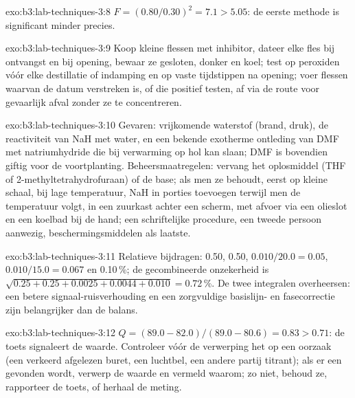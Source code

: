 \begin{solution}{exo:b3:lab-techniques-3:8}
$F = (0.80/0.30)^2 = 7.1 > 5.05$: de eerste methode is significant minder precies.
\end{solution}

\begin{solution}{exo:b3:lab-techniques-3:9}
Koop kleine flessen met inhibitor, dateer elke fles bij ontvangst en bij
opening, bewaar ze gesloten, donker en koel; test op peroxiden vóór elke
destillatie of indamping en op vaste tijdstippen na opening; voer
flessen waarvan de datum verstreken is, of die positief testen, af via
de route voor gevaarlijk afval zonder ze te concentreren.
\end{solution}

\begin{solution}{exo:b3:lab-techniques-3:10}
Gevaren: vrijkomende waterstof (brand, druk), de reactiviteit van NaH met
water, en een bekende exotherme ontleding van DMF met natriumhydride die
bij verwarming op hol kan slaan; DMF is bovendien giftig voor de
voortplanting. Beheersmaatregelen: vervang het oplosmiddel (THF of
2-methyltetrahydrofuraan) of de base; als men ze behoudt, eerst op
kleine schaal, bij lage temperatuur, NaH in porties toevoegen terwijl
men de temperatuur volgt, in een zuurkast achter een scherm, met afvoer
via een olieslot en een koelbad bij de hand; een schriftelijke
procedure, een tweede persoon aanwezig, beschermingsmiddelen als
laatste.
\end{solution}

\begin{solution}{exo:b3:lab-techniques-3:11}
Relatieve bijdragen: 0.50, 0.50, $0.010/20.0 = 0.05$, $0.010/15.0 = 0.067$ en 0.10\,\%; de
gecombineerde onzekerheid is $\sqrt{0.25 + 0.25 + 0.0025 + 0.0044 + 0.010} = 0.72$\,\%. De twee integralen overheersen: een betere
signaal-ruisverhouding en een zorgvuldige basislijn- en fasecorrectie
zijn belangrijker dan de balans.
\end{solution}

\begin{solution}{exo:b3:lab-techniques-3:12}
$Q = (89.0 - 82.0)/(89.0 - 80.6) = 0.83 > 0.71$: de toets signaleert de waarde. Controleer vóór de verwerping het 
op een oorzaak (een verkeerd afgelezen buret, een luchtbel, een andere
partij titrant); als er een gevonden wordt, verwerp de waarde en vermeld
waarom; zo niet, behoud ze, rapporteer de toets, of herhaal de meting.
\end{solution}

